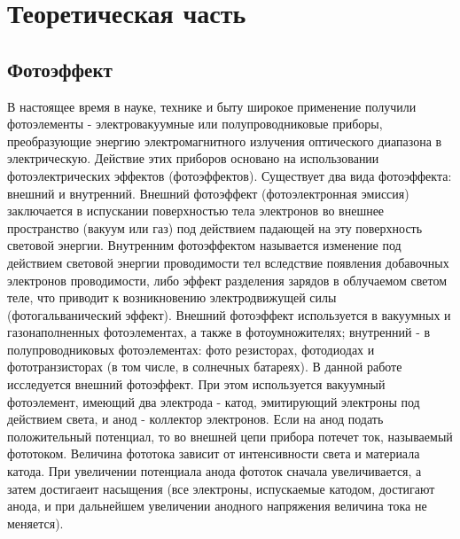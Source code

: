 



\def\labauthors{Войтович Д.А., Карусевич А.А., Разова А.А.}
\def\labgroup{430}
\def\labnumber{1}
\def\labtheme{Исследование фотоэффекта и измерение постоянной Планка}
\renewcommand{\vec}{\mathbf}
\renewcommand{\Re}{\operatorname{Re}}
\renewcommand{\Im}{\operatorname{Im}}
\renewcommand{\phi}{\varphi}
\renewcommand{\hat}{\widehat}



\section{Теоретическая часть}
\subsection*{Фотоэффект}
В настоящее время в науке, технике и быту широкое применение получили фотоэлементы - электровакуумные или полупроводниковые приборы, преобразующие энергию электромагнитного излучения оптического диапазона в электрическую. Действие этих приборов основано на использовании фотоэлектрических эффектов (фотоэффектов). 
Существует два вида фотоэффекта: внешний и внутренний. Внешний фотоэффект (фотоэлектронная эмиссия) заключается в испускании поверхностью тела электронов во внешнее пространство (вакуум или газ) под действием падающей на эту поверхность световой энергии. Внутренним фотоэффектом называется изменение под действием световой энергии проводимости тел вследствие появления добавочных электронов проводимости, либо эффект разделения зарядов в облучаемом светом теле, что приводит к возникновению электродвижущей силы (фотогальванический эффект). Внешний фотоэффект используется в вакуумных и газонаполненных фотоэлементах, а также в фотоумножителях; внутренний - в полупроводниковых фотоэлементах: фото резисторах, фотодиодах и фототранзисторах (в том числе, в солнечных батареях).
В данной работе исследуется внешний фотоэффект. При этом используется вакуумный фотоэлемент, имеющий два электрода - катод, эмитирующий электроны под действием света, и анод - коллектор электронов. Если на анод подать положительный потенциал, то во внешней цепи прибора потечет ток, называемый фототоком. Величина фототока зависит от интенсивности света и материала катода. При увеличении потенциала анода фототок сначала увеличивается, а затем достигаеит насыщения (все электроны, испускаемые катодом, достигают анода, и при дальнейшем увеличении анодного напряжения величина тока не меняется).
